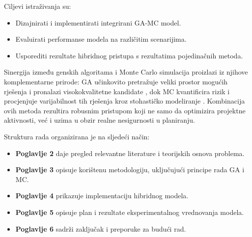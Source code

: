 Ciljevi istraživanja su:
\begin{itemize}
    \item Dizajnirati i implementirati integrirani GA-MC model.
    \item Evaluirati performanse modela na različitim scenarijima.
    \item Usporediti rezultate hibridnog pristupa s rezultatima pojedinačnih metoda.
\end{itemize}

Sinergija između genskih algoritama i Monte Carlo simulacija proizlazi iz njihove komplementarne prirode: GA učinkovito pretražuje veliki prostor mogućih rješenja i pronalazi visokokvalitetne kandidate \cite{Goldberg1989}, dok MC kvantificira rizik i procjenjuje varijabilnost tih rješenja kroz stohastičko modeliranje \cite{Rubinstein2016}. Kombinacija ovih metoda rezultira robusnim pristupom koji ne samo da optimizira projektne aktivnosti, već i uzima u obzir realne nesigurnosti u planiranju.

Struktura rada organizirana je na sljedeći način:
\begin{itemize}
    \item \textbf{Poglavlje 2} daje pregled relevantne literature i teorijskih osnova problema.
    \item \textbf{Poglavlje 3} opisuje korištenu metodologiju, uključujući principe rada GA i MC.
    \item \textbf{Poglavlje 4} prikazuje implementaciju hibridnog modela.
    \item \textbf{Poglavlje 5} opisuje plan i rezultate eksperimentalnog vrednovanja modela.
    \item \textbf{Poglavlje 6} sadrži zaključak i preporuke za budući rad.
\end{itemize}

